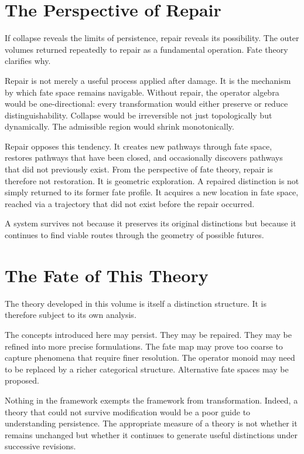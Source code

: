 \documentclass[12pt,twoside,openright]{book}
\begin{document}
\section{The Perspective of Repair}

If collapse reveals the limits of persistence, repair reveals
its possibility. The outer volumes returned repeatedly to
repair as a fundamental operation. Fate theory clarifies why.

Repair is not merely a useful process applied after damage. It
is the mechanism by which fate space remains navigable.
Without repair, the operator algebra would be one-directional:
every transformation would either preserve or reduce
distinguishability. Collapse would be irreversible not just
topologically but dynamically. The admissible region would
shrink monotonically.

Repair opposes this tendency. It creates new pathways through
fate space, restores pathways that have been closed, and
occasionally discovers pathways that did not previously exist.
From the perspective of fate theory, repair is therefore not
restoration. It is geometric exploration. A repaired
distinction is not simply returned to its former fate profile.
It acquires a new location in fate space, reached via a
trajectory that did not exist before the repair occurred.

A system survives not because it preserves its original
distinctions but because it continues to find viable routes
through the geometry of possible futures.

\section{The Fate of This Theory}

The theory developed in this volume is itself a distinction
structure. It is therefore subject to its own analysis.

The concepts introduced here may persist. They may be repaired.
They may be refined into more precise formulations. The fate
map may prove too coarse to capture phenomena that require
finer resolution. The operator monoid may need to be replaced
by a richer categorical structure. Alternative fate spaces may
be proposed.

Nothing in the framework exempts the framework from
transformation. Indeed, a theory that could not survive
modification would be a poor guide to understanding
persistence. The appropriate measure of a theory is not whether
it remains unchanged but whether it continues to generate
useful distinctions under successive revisions.
\end{document}
